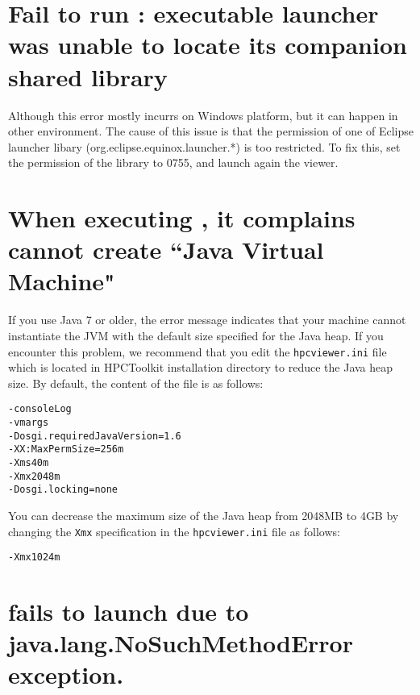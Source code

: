 \documentclass[11pt,letterpaper]{report}
\begin{document}

\section{Fail to run \hpcviewer{}: executable launcher was unable to locate its companion shared library}

Although this error mostly incurrs on Windows platform, but it can happen in other environment. 
The cause of this issue is that the permission of one of Eclipse launcher libary (org.eclipse.equinox.launcher.*) is too restricted. 
To fix this, set the permission of the library to 0755, and launch again the viewer.



\section{When executing \hpcviewer, it complains cannot create ``Java Virtual Machine"}
If you use Java 7 or older,
the error message indicates that your machine cannot instantiate the JVM 
with the default size specified for the Java heap. 
If you encounter this problem, we recommend that you edit the 
\texttt{hpcviewer.ini} 
file which is located in HPCToolkit installation directory to reduce the
Java heap size.
By default, the content of the file is as follows:
\begin{verbatim}
-consoleLog
-vmargs
-Dosgi.requiredJavaVersion=1.6
-XX:MaxPermSize=256m
-Xms40m
-Xmx2048m
-Dosgi.locking=none
\end{verbatim}
You can decrease the maximum size of the Java heap from 2048MB to 4GB
 by changing the {\tt Xmx} specification in the \texttt{hpcviewer.ini} file as follows:
\begin{verbatim}
-Xmx1024m
\end{verbatim}



\section{\hpcviewer{} fails to launch due to java.lang.NoSuchMethodError exception.}
\end{document}
